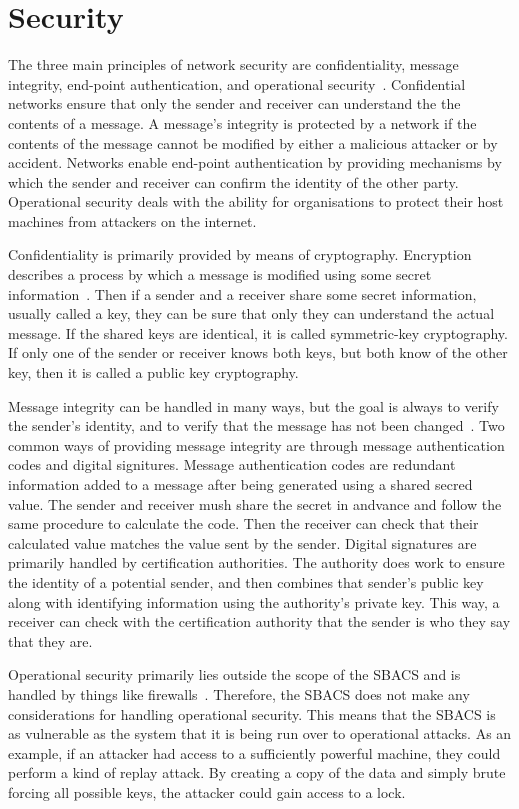 \documentclass[12pt]{report}
\let\Oldsection\section
\renewcommand{\section}{\FloatBarrier\Oldsection}
\begin{document}
\section{Security} \label{security}

The three main principles of network security are confidentiality, message integrity, end-point authentication, and
operational security~\autocite{NETWORKTEXTBOOK}. Confidential networks ensure that only the sender and receiver can
understand the the contents of a message. A message's integrity is protected by a network if the contents of the message
cannot be modified by either a malicious attacker or by accident. Networks enable end-point authentication by providing
mechanisms by which the sender and receiver can confirm the identity of the other party. Operational security deals with
the ability for organisations to protect their host machines from attackers on the internet.

Confidentiality is primarily provided by means of cryptography. Encryption describes a process by which a message is
modified using some secret information~\autocite{NETWORKTEXTBOOK}. Then if a sender and a receiver share some secret
information, usually called a key, they can be sure that only they can understand the actual message. If the shared keys
are identical, it is called symmetric-key cryptography. If only one of the sender or receiver knows both keys, but both
know of the other key, then it is called a public key cryptography.

Message integrity can be handled in many ways, but the goal is always to verify the sender's identity, and to verify
that the message has not been changed~\autocite{NETWORKTEXTBOOK}. Two common ways of providing message integrity are
through message authentication codes and digital signitures. Message authentication codes are redundant information
added to a message after being generated using a shared secred value. The sender and receiver mush share the secret in
andvance and follow the same procedure to calculate the code. Then the receiver can check that their calculated value
matches the value sent by the sender. Digital signatures are primarily handled by certification authorities. The
authority does work to ensure the identity of a potential sender, and then combines that sender's public key along with
identifying information using the authority's private key. This way, a receiver can check with the certification
authority that the sender is who they say that they are.

Operational security primarily lies outside the scope of the SBACS and is handled by things like firewalls~\autocite
{NETWORKTEXTBOOK}. Therefore, the SBACS does not make any considerations for handling operational security. This means
that the SBACS is as vulnerable as the system that it is being run over to operational attacks. As an example, if an
attacker had access to a sufficiently powerful machine, they could perform a kind of replay attack. By creating a copy
of the data and simply brute forcing all possible keys, the attacker could gain access to a lock.
\end{document}
